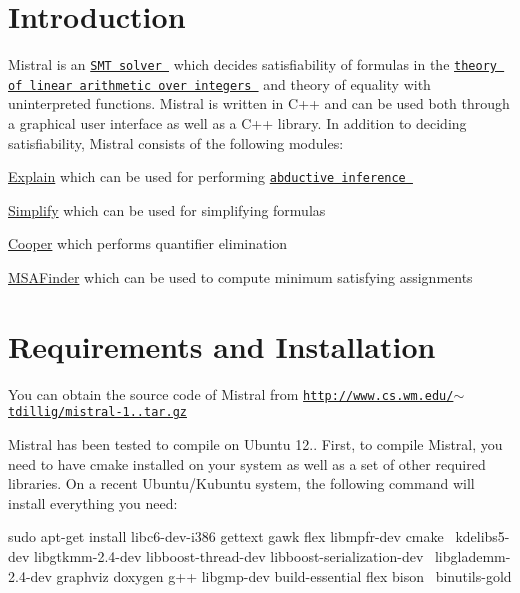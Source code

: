 \hypertarget{index_intro_sec}{}\section{\-Introduction}\label{index_intro_sec}
\-Mistral is an \href{http://en.wikipedia.org/wiki/Satisfiability_Modulo_Theories}{\tt \-S\-M\-T solver } which decides satisfiability of formulas in the \href{http://en.wikipedia.org/wiki/Presburger_arithmetic}{\tt theory of linear arithmetic over integers } and theory of equality with uninterpreted functions. \-Mistral is written in \-C++ and can be used both through a graphical user interface as well as a \-C++ library. \-In addition to deciding satisfiability, \-Mistral consists of the following modules\-:
\begin{DoxyItemize}
\item \hyperlink{explain}{\-Explain} which can be used for performing \href{http://en.wikipedia.org/wiki/Abductive_reasoning}{\tt abductive inference }
\item \hyperlink{simplify}{\-Simplify} which can be used for simplifying formulas
\item \hyperlink{cooper}{\-Cooper} which performs quantifier elimination
\item \hyperlink{msa}{\-M\-S\-A\-Finder} which can be used to compute minimum satisfying assignments
\end{DoxyItemize}\hypertarget{index_req_section}{}\section{\-Requirements and Installation}\label{index_req_section}
\-You can obtain the source code of \-Mistral from \href{http://www.cs.wm.edu/~tdillig/mistral-1.1.tar.gz}{\tt http\-://www.\-cs.\-wm.\-edu/$\sim$tdillig/mistral-\/1..\-tar.\-gz}

\-Mistral has been tested to compile on \-Ubuntu 12.. \-First, to compile \-Mistral, you need to have cmake installed on your system as well as a set of other required libraries. \-On a recent \-Ubuntu/\-Kubuntu system, the following command will install everything you need\-: \begin{DoxyVerb}
sudo apt-get install libc6-dev-i386 gettext gawk flex libmpfr-dev cmake  \
kdelibs5-dev libgtkmm-2.4-dev libboost-thread-dev libboost-serialization-dev \
libglademm-2.4-dev graphviz doxygen g++ libgmp-dev build-essential flex bison  \
binutils-gold
\end{DoxyVerb}



